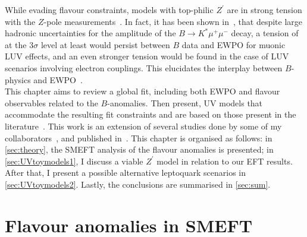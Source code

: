 While evading flavour constraints, models with top-philic $Z^\prime$ are in strong tension with the $Z$-pole measurements~\cite{Camargo-Molina:2018cwu,Efrati:2015eaa}. In fact, it has been shown in~\cite{Ciuchini:2019usw}, that despite large hadronic uncertainties for the amplitude of the $B \to K^{*} \mu^{+} \mu^{-}$ decay, a tension of at the 3$\sigma$ level at least would persist between $B$ data and EWPO for muonic LUV effects, and an even stronger tension would be found in the case of LUV scenarios involving electron couplings. This elucidates the interplay between $B$-physics and EWPO~\cite{Bhattacharya:2014wla,Feruglio:2016gvd,Celis:2017doq,Buttazzo:2017ixm,Kumar:2018kmr,Ciuchini:2019usw,Aebischer:2019mlg,Cornella:2019hct}. \\
This chapter aims to review a global fit, including both EWPO and flavour observables related to the $B$-anomalies. Then present, UV models that accommodate the resulting fit constraints and are based on those present in the literature~\cite{Kamenik:2017tnu,Fox:2018ldq,Celis:2017doq}. This work is an extension of several studies done by some of my collaborators~\cite{Ciuchini:2015qxb,Ciuchini:2016weo,Ciuchini:2017mik,Ciuchini:2017gva,Ciuchini:2018xll,Ciuchini:2018anp,Ciuchini:2019usw}, and published in~\cite{Alasfar:2020mne}. 
This chapter is organised as follows: in \autoref{sec:theory}, the SMEFT analysis of the flavour anomalies is presented; in \autoref{sec:UVtoymodels1}, I discuss a viable $Z^{\prime}$ model in relation to our EFT results. After that, I present a possible alternative leptoquark scenarios in~ \autoref{sec:UVtoymodels2}. Lastly, the conclusions are summarised in \autoref{sec:sum}.
\section{Flavour anomalies in SMEFT }
\label{sec:theory}
